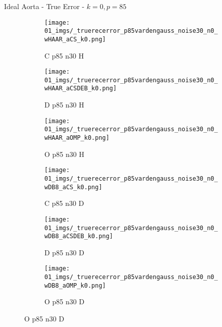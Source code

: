 \begin{frame}{Ideal Aorta - True Error - $k=0,p=85$}{}
\begin{figure}
\begin{subfigure}{0.13\textwidth}
\texttt{[image: 01\_imgs/\_truerecerror\_p85vardengauss\_noise30\_n0\_wHAAR\_aCS\_k0.png]}
\caption*{\tiny C p85 n30 H}
\end{subfigure}
\begin{subfigure}{0.13\textwidth}
\texttt{[image: 01\_imgs/\_truerecerror\_p85vardengauss\_noise30\_n0\_wHAAR\_aCSDEB\_k0.png]}
\caption*{\tiny D p85 n30 H}
\end{subfigure}
\begin{subfigure}{0.13\textwidth}
\texttt{[image: 01\_imgs/\_truerecerror\_p85vardengauss\_noise30\_n0\_wHAAR\_aOMP\_k0.png]}
\caption*{\tiny O p85 n30 H}
\end{subfigure}
\begin{subfigure}{0.13\textwidth}
\texttt{[image: 01\_imgs/\_truerecerror\_p85vardengauss\_noise30\_n0\_wDB8\_aCS\_k0.png]}
\caption*{\tiny C p85 n30 D}
\end{subfigure}
\begin{subfigure}{0.13\textwidth}
\texttt{[image: 01\_imgs/\_truerecerror\_p85vardengauss\_noise30\_n0\_wDB8\_aCSDEB\_k0.png]}
\caption*{\tiny D p85 n30 D}
\end{subfigure}
\begin{subfigure}{0.13\textwidth}
\texttt{[image: 01\_imgs/\_truerecerror\_p85vardengauss\_noise30\_n0\_wDB8\_aOMP\_k0.png]}
\caption*{\tiny O p85 n30 D}
\end{subfigure}
\end{figure}
\end{frame}

